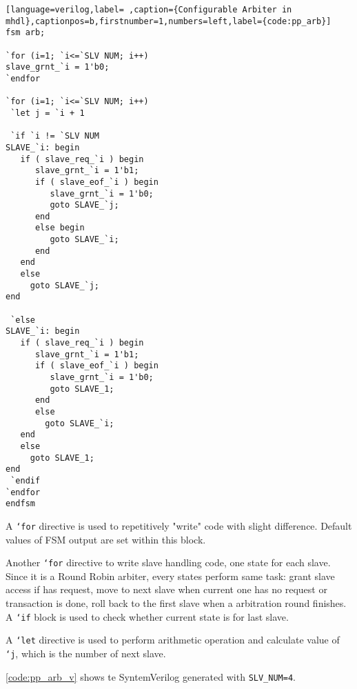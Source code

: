 \documentclass[10pt,oneside]{book}
\begin{document}
\begin{lstlisting}[language=verilog,label= ,caption={Configurable Arbiter in mhdl},captionpos=b,firstnumber=1,numbers=left,label={code:pp_arb}]
fsm arb;

`for (i=1; `i<=`SLV NUM; i++)
slave_grnt_`i = 1'b0;
`endfor

`for (i=1; `i<=`SLV NUM; i++)
 `let j = `i + 1

 `if `i != `SLV NUM
SLAVE_`i: begin
   if ( slave_req_`i ) begin
      slave_grnt_`i = 1'b1;
      if ( slave_eof_`i ) begin
         slave_grnt_`i = 1'b0;
         goto SLAVE_`j;
      end
      else begin
         goto SLAVE_`i;
      end
   end
   else
     goto SLAVE_`j;
end

 `else
SLAVE_`i: begin
   if ( slave_req_`i ) begin
      slave_grnt_`i = 1'b1;
      if ( slave_eof_`i ) begin
         slave_grnt_`i = 1'b0;
         goto SLAVE_1;
      end
      else
        goto SLAVE_`i;
   end
   else
     goto SLAVE_1;
end
 `endif
`endfor
endfsm
\end{lstlisting}

A \texttt{`for} directive is used to repetitively "write" code with slight
difference.  Default values of FSM output are set within this block.

Another \texttt{`for} directive to write slave handling code, one state for
each slave.  Since it is a Round Robin arbiter, every states perform
same task: grant slave access if has request, move to next slave when
current one has no request or transaction is done, roll back to the
first slave when a arbitration round finishes.  A \texttt{`if} block is used
to check whether current state is for last slave.

A \texttt{`let} directive is used to perform arithmetic operation and
calculate value of \texttt{`j}, which is the number of next slave.

\autoref{code:pp_arb_v} shows te SyntemVerilog generated with \texttt{SLV\_NUM=4}.
\end{document}
